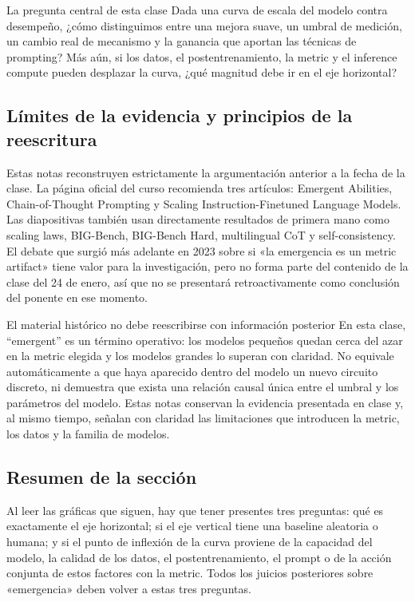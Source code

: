 \begin{importantbox}{La pregunta central de esta clase}
Dada una curva de escala del modelo contra desempeño, ¿cómo distinguimos entre una mejora suave, un umbral de medición, un cambio real de mecanismo y la ganancia que aportan las técnicas de prompting? Más aún, si los datos, el postentrenamiento, la metric y el inference compute pueden desplazar la curva, ¿qué magnitud debe ir en el eje horizontal?
\end{importantbox}


\subsection{Límites de la evidencia y principios de la reescritura}

Estas notas reconstruyen estrictamente la argumentación anterior a la fecha de la clase. La página oficial del curso recomienda tres artículos: Emergent Abilities, Chain-of-Thought Prompting y Scaling Instruction-Finetuned Language Models. Las diapositivas también usan directamente resultados de primera mano como scaling laws, BIG-Bench, BIG-Bench Hard, multilingual CoT y self-consistency. El debate que surgió más adelante en 2023 sobre si «la emergencia es un metric artifact» tiene valor para la investigación, pero no forma parte del contenido de la clase del 24 de enero, así que no se presentará retroactivamente como conclusión del ponente en ese momento.

\begin{warningbox}{El material histórico no debe reescribirse con información posterior}
En esta clase, ``emergent'' es un término operativo: los modelos pequeños quedan cerca del azar en la metric elegida y los modelos grandes lo superan con claridad. No equivale automáticamente a que haya aparecido dentro del modelo un nuevo circuito discreto, ni demuestra que exista una relación causal única entre el umbral y los parámetros del modelo. Estas notas conservan la evidencia presentada en clase y, al mismo tiempo, señalan con claridad las limitaciones que introducen la metric, los datos y la familia de modelos.
\end{warningbox}

\subsection{Resumen de la sección}

Al leer las gráficas que siguen, hay que tener presentes tres preguntas: qué es exactamente el eje horizontal; si el eje vertical tiene una baseline aleatoria o humana; y si el punto de inflexión de la curva proviene de la capacidad del modelo, la calidad de los datos, el postentrenamiento, el prompt o de la acción conjunta de estos factores con la metric. Todos los juicios posteriores sobre «emergencia» deben volver a estas tres preguntas.
